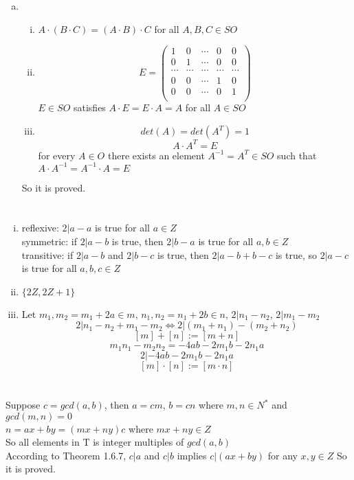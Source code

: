 \documentclass{article}
\begin{document}
\begin{enumerate}[i)]
\begin{enumerate}[(a)]
\item
\begin{enumerate}[(i)]
\item
$A\cdot(B\cdot C)=(A\cdot B)\cdot C$ for all $A,B,C\in SO$
\item
\begin{equation*}
E=\left(
\begin{array}{ccccc}
1 & 0 & \cdots & 0 & 0\\
0 & 1 & \cdots & 0 & 0\\
\cdots & \cdots & \cdots & \cdots & \cdots\\
0 & 0 & \cdots & 1 & 0\\
0 & 0 & \cdots & 0 & 1\\
\end{array}
\right)
\end{equation*}
$E\in SO$ satisfies $A\cdot E=E\cdot A=A$ for all $A\in SO$
\item
$$det(A)=det(A^T)=1$$
$$A\cdot A^T=E$$
for every $A\in O$ there exists an element $A^{-1}=A^T\in SO$ such that $A\cdot A^{-1}=A^{-1}\cdot A=E$
\end{enumerate}
So it is proved.
\end{enumerate}

\end{enumerate}

\section{}
\begin{enumerate}[i)]
\item
reflexive: $2|a-a$ is true for all $a\in Z$\\
symmetric: if $2|a-b$ is true, then $2|b-a$ is true for all $a,b\in Z$\\
transitive: if $2|a-b$ and $2|b-c$ is true, then $2|a-b+b-c$ is true, so $2|a-c$ is true for all $a,b,c\in Z$
\item
$\lbrace2Z,2Z+1\rbrace$
\item
Let $m_1,m_2=m_1+2a\in m$, $n_1,n_2=n_1+2b\in n$, $2|n_1-n_2$, $2|m_1-m_2$\\
$$2|n_1-n_2+m_1-m_2\Longleftrightarrow2|(m_1+n_1)-(m_2+n_2)$$
$$[m]+[n]:=[m+n]$$
$$m_1n_1-m_2n_2=-4ab-2m_1b-2n_1a$$
$$2|-4ab-2m_1b-2n_1a$$
$$[m]\cdot[n]:=[m\cdot n]$$
\end{enumerate}

\section{}
Suppose $c=gcd(a,b)$, then $a=cm$, $b=cn$ where $m,n\in N^*$ and $gcd(m,n)=0$\\
$n=ax+by=(mx+ny)c$ where $mx+ny\in Z$\\
So all elements in T is integer multiples of $gcd(a,b)$\\
According to Theorem 1.6.7, $c|a$ and $c|b$ implies $c|(ax+by)$ for any $x,y\in Z$
So it is proved.
\end{document}
